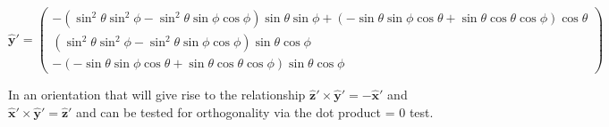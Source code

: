 \documentclass[11pt]{article}
\begin{document}
\begin{equation}
   \mathbf{\hat{y}'}=\left(
    \begin{array}{c}
     -(\sin^2\theta\sin^2\phi - \sin^2\theta\sin\phi\cos\phi)\sin\theta\sin\phi + (-\sin\theta\sin\phi\cos\theta + \sin\theta\cos\theta\cos\phi)\cos\theta  \\ 

(\sin^2\theta\sin^2\phi - \sin^2\theta\sin\phi\cos\phi)\sin\theta\cos\phi\\
-(-\sin\theta\sin\phi\cos\theta + \sin\theta\cos\theta\cos\phi)\sin\theta\cos\phi
\end{array} 
\right) 
\end{equation}

In an orientation that will give rise to the relationship $\mathbf{\hat{z}} '\times \mathbf{\hat{y}} '= \mathbf{-\hat{x}}'$  and $\mathbf{\hat{x}' \times \hat{y}'=\hat{z}}' $ and can be tested for orthogonality via the dot product = 0 test.
\end{document}
